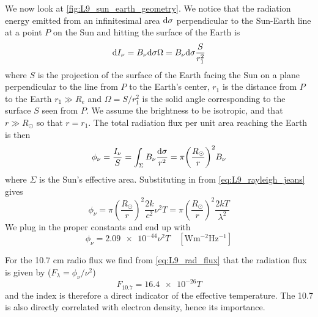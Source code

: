We now look at \cref{fig:L9_sun_earth_geometry}. We notice that the radiation energy emitted from an infinitesimal area \(\textnormal{d}\sigma \) perpendicular to the Sun-Earth line at a point \(P\) on the Sun and hitting the surface of the Earth is
\begin{equation*}
    \textnormal{d}I_\nu=B_\nu\textnormal{d}\sigma\Omega=B_\nu\textnormal{d}\sigma\frac{S}{r_1^2}
\end{equation*}
where \(S\) is the projection of the surface of the Earth facing the Sun on a plane perpendicular to the line from \(P\) to the Earth's center, \(r_1\) is the distance from \(P\) to the Earth \(r_1\gg R_e\) and \(\Omega=S/r_1^2\) is the solid angle corresponding to the surface \(S\) seen from \(P\). We assume the brightness to be isotropic, and that \(r\gg R_\odot \) so that \(r=r_1\). The total radiation flux per unit area reaching the Earth is then
\begin{equation*}
    \phi_\nu=\frac{I_\nu}{S}=\int_\Sigma B_\nu\frac{\textnormal{d}\sigma}{r^2}=\pi{\left(\frac{R_\odot}{r}\right)}^2B_\nu
\end{equation*}
where \(\Sigma \) is the Sun's effective area. Substituting in from \cref{eq:L9_rayleigh_jeans} gives
\begin{equation*}
    \phi_\nu=\pi{\left(\frac{R_\odot}{r}\right)}^2\frac{2k}{c^2}\nu^2T=\pi{\left(\frac{R_\odot}{r}\right)}^2\frac{2kT}{\lambda^2}
\end{equation*}
We plug in the proper constants and end up with
\begin{equation}\label{eq:L9_rad_flux}
    \phi_\nu=\num{2.09e-44}\nu^2T\quad \left[\si{\watt\metre^{-2}\hertz^{-1}}\right]
\end{equation}

For the 10.7 cm radio flux we find from \cref{eq:L9_rad_flux} that the radiation flux is given by (\(F_\lambda=\phi_\nu/\nu^2\))
\begin{equation*}
    F_{10.7}=\num{16.4e-26}T
\end{equation*}
and the index is therefore a direct indicator of the effective temperature. The 10.7 is also directly correlated with electron density, hence its importance.

